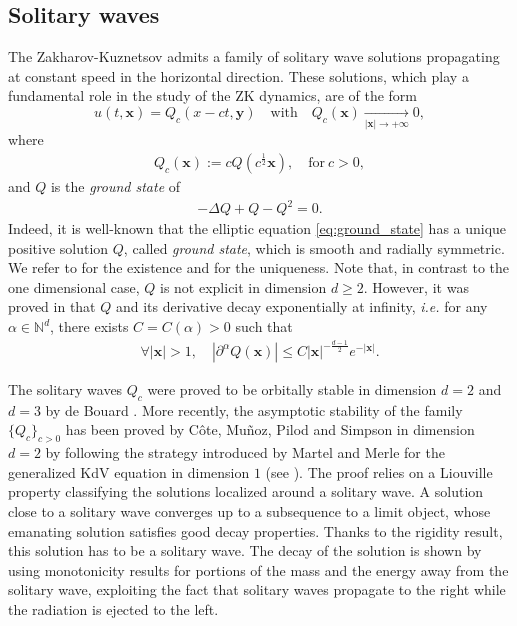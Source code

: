 \documentclass[reqno,10pt]{amsart}
\numberwithin{equation}{section}
\newcommand{\bx}{\mathbf{x}}
\newcommand{\by}{\mathbf{y}}
\begin{document}
	\subsection{Solitary waves}
	The Zakharov-Kuznetsov admits a family of solitary wave solutions propagating at constant speed in the horizontal direction. These solutions, which play a fundamental role in the study of the ZK dynamics, are of the form 
	\[ u(t,\bx)=Q_c(x - ct ,\by) \quad  \text{with} \quad Q_c(\bx) \underset{|\bx| \to +\infty}{\longrightarrow} 0 , \]
	where 
	\begin{align}\label{defi:scaling}
		Q_c(\bx) := c Q ( c^{\frac12} \bx ), \quad \text{for} \ c>0, 
	\end{align}
	and $Q$ is the \emph{ground state} of 
	\begin{align}\label{eq:ground_state}
		- \Delta Q+Q -Q^2=0.
	\end{align}
	Indeed, it is well-known that the elliptic equation \eqref{eq:ground_state} has a unique positive solution $Q$, called \emph{ground state}, which is smooth and radially symmetric. We refer to \cite{Strau77,BLP81} for the existence and \cite{Kwo89} for the uniqueness. Note that, in contrast to the one dimensional case, $Q$ is not explicit in dimension $d \ge 2$. However, it was proved in \cite{GNN81} that $Q$ and its derivative decay exponentially at infinity, \textit{i.e.} for any $\alpha \in \mathbb N^d$, there exists $C=C(\alpha)>0$ such that
	\begin{align}\label{asym:Q}
		\forall \vert \bx \vert >1, \quad \left\vert \partial^{\alpha}Q(\bx) \right\vert \leq C \vert \bx \vert^{-\frac{d-1}2} e^{-\vert \bx \vert}.
	\end{align}
	
	The solitary waves $Q_c$ were proved to be orbitally stable in dimension $d=2$ and $d=3$ by de Bouard \cite{deB96}. More recently, the asymptotic stability of the family $\{Q_c\}_{c>0}$ has been proved by C\^ote, Mu\~noz, Pilod and Simpson \cite{CMPS16} in dimension $d=2$ by following the strategy introduced by Martel and Merle for the generalized KdV equation in dimension $1$ (see \cite{MM01,MM05,MM08}). The proof relies on a Liouville property classifying the solutions localized around a solitary wave. A solution close to a solitary wave converges up to a subsequence to a limit object, whose emanating solution satisfies good decay properties. Thanks to the rigidity result, this solution has to be a solitary wave. The decay of the solution is shown by using monotonicity results for portions of the mass and the energy away from the solitary wave, exploiting the fact that solitary waves propagate to the right while the radiation is ejected to the left. 
	
\end{document}
